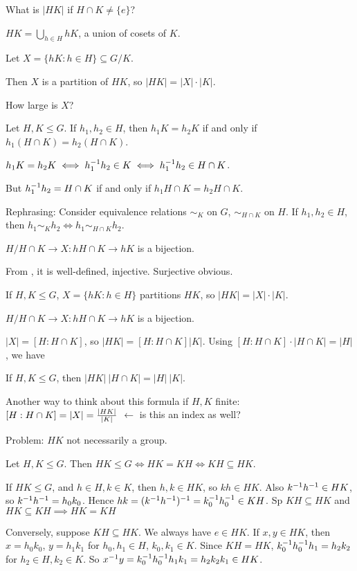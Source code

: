 What is $|HK|$ if $H\cap K\ne \{e\}$?

$HK = \bigcup_{h\in H} hK$, a union of cosets of $K$.

Let $X=\{hK:h\in H\}\subseteq G/K$.

Then $X$ is a partition of $HK$, so $|HK|=|X|\cdot |K|$.

How large is $X$?

\begin{lemma}
Let $H,K\le G$. If $h_1,h_2\in H$, then $h_1K=h_2K$ if and only if $h_1(H\cap K)=h_2(H\cap K)$.
\end{lemma}

\begin{pf}
$h_1K=h_2K \iff h_1^{-1} h_2\in K \iff h_1^{-1} h_2 \in H\cap K$.

But $h_1^{-1} h_2=H\cap K$ if and only if $h_1H\cap K =h_2 H\cap K$.
\end{pf}
Rephrasing: Consider equivalence relations $\sim_K$ on $G$, $\sim_{H\cap K}$ on $H$. If $h_1,h_2\in H$, then $h_1\sim_K h_2\iff h_1\sim_{H\cap K}h_2$.

\begin{corr}
$H/H\cap K\to X:hH\cap K\to hK$ is a bijection.
\end{corr}

\begin{pf}
From , it is well-defined, injective. Surjective obvious.
\end{pf}

If $H,K\le G$, $X=\{hK:h\in H\}$ partitions $HK$, so $|HK|= |X|\cdot |K|$.

\begin{corr}
$H/H\cap K\to X: hH \cap K\to hK$ is a bijection.
\end{corr}
$|X|=[H:H\cap K]$, so $|HK|=[H:H\cap K]|K|$. Using $[H:H\cap K]\cdot |H\cap K| = |H|$, we have 
\begin{prop}
If $H,K\le G$, then $|HK|~|H\cap K| = |H|~|K|$.
\end{prop}
Another way to think about this formula if $H,K$ finite: $[H:H\cap K]=|X|={|HK|\over |K|}$ $\leftarrow$ is this an index as well?

Problem: $HK$ not necessarily a group.

\begin{prop}
Let $H,K\le G$. Then $HK\le G\iff HK=KH \iff KH\subseteq HK$.
\end{prop}

\begin{pf}
If $HK\le G$, and $h\in H,k\in K$, then $h,k\in HK$, so $kh\in HK$.
Also $k^{-1} h^{-1} \in HK$, so $k^{-1} h^{-1} = h_0 k_0$.
Hence $hk=(k^{-1} h^{-1})^{-1} = k_0^{-1} h_0^{-1} \in KH$.
Sp $KH\subseteq HK$ and $HK\subseteq KH\implies HK=KH$

Conversely, suppose $KH\subseteq HK$. We always have $e\in HK$. If $x,y\in HK$, then $x=h_0k_0$, $y=h_1k_1$ for $h_0,h_1\in H$, $k_0,k_1\in K$. Since $KH=HK$, $k_0^{-1} h_0^{-1} h_1=h_2k_2$ for $h_2\in H,k_2\in K$. So $x^{-1} y=k_0^{-1} h_0^{-1} h_1k_1=h_2k_2k_1\in HK$.
\end{pf}

